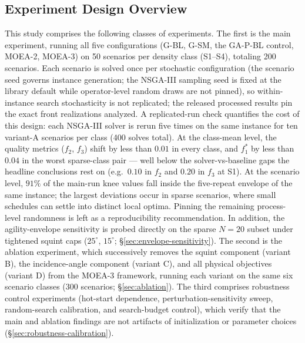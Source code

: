 \documentclass[preprint,12pt,authoryear]{elsarticle}
\begin{document}
\subsection{Experiment Design Overview}
\label{sec:experiment-design}

This study comprises the following classes of experiments.
The first is the main experiment, running all five configurations (G-BL, G-SM,
the GA-P-BL control, MOEA-2, MOEA-3)
on 50 scenarios per density class (S1--S4), totaling 200 scenarios.
Each scenario is solved once per stochastic configuration (the scenario seed
governs instance generation; the NSGA-III sampling seed is fixed at the
library default while operator-level random draws are not pinned), so
within-instance search stochasticity is not replicated; the released
processed results pin the exact front realizations analyzed.
A replicated-run check quantifies the cost of this design: each NSGA-III
solver is rerun five times on the same instance for ten variant-A scenarios
per class (400 solves total). At the class-mean level, the quality metrics
($f_2$, $f_3$) shift by less than $0.01$ in every class, and $f_1^*$ by less
than $0.04$ in the worst sparse-class pair --- well below the
solver-vs-baseline gaps the headline conclusions rest on (e.g.\ $0.10$ in
$f_2$ and $0.20$ in $f_3$ at S1). At the scenario level, $91\%$ of the main-run knee
values fall inside the five-repeat envelope of the same instance; the
largest deviations occur in sparse scenarios, where small schedules can
settle into distinct local optima. Pinning the remaining process-level
randomness is left as a reproducibility recommendation. In addition, the
agility-envelope sensitivity is probed directly on the sparse $N=20$
subset under tightened squint caps
($25^\circ$, $15^\circ$; \S\ref{sec:envelope-sensitivity}).
The second is the ablation experiment, which successively removes the squint component
(variant B), the incidence-angle component (variant C), and all physical objectives
(variant D) from the MOEA-3 framework, running each variant on the same
six scenario classes (300 scenarios; \S\ref{sec:ablation}).
The third comprises robustness control experiments (hot-start dependence,
perturbation-sensitivity sweep, random-search calibration, and search-budget control),
which verify that the main and ablation findings are not artifacts of initialization
or parameter choices (\S\ref{sec:robustness-calibration}).
\end{document}

